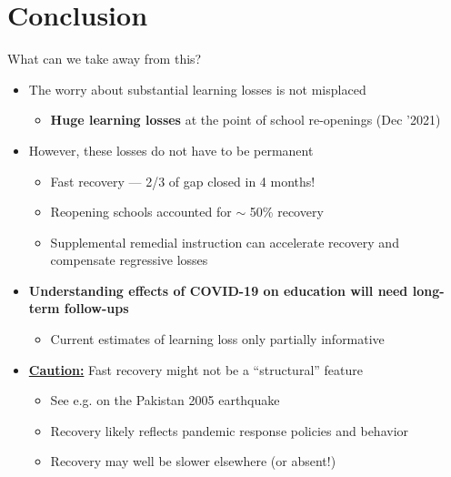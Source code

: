 \documentclass[aspectratio=169,numbering=none]{beamer}
\begin{document}
\section{Conclusion}

\begin{frame}[plain]{What can we take away from this?}
\begin{itemize}
\vfill \item The worry about substantial learning losses is not misplaced
\begin{itemize}
\vfill\item \textbf{Huge learning losses} at the point of school re-openings (Dec '2021)
\end{itemize}
\vfill \item However, these losses do not have to be permanent
\begin{itemize}
\vfill\item Fast recovery ---  2/3 of gap closed in 4 months!
\vfill\item Reopening schools accounted for $\sim$ 50\% recovery
\vfill \item Supplemental remedial instruction can accelerate recovery and compensate regressive losses
\end{itemize}
\vfill \item \textbf{Understanding effects of COVID-19 on education will need long-term follow-ups}
\begin{itemize}
\vfill\item Current estimates of learning loss only partially informative
\end{itemize}
\vfill \item \underline{\textbf{Caution:}} Fast recovery might not be a ``structural'' feature
\begin{itemize}
\vfill\item See e.g.  on the Pakistan 2005 earthquake
\vfill\item Recovery likely reflects pandemic response policies and behavior 
\vfill\item Recovery may well be slower elsewhere (or absent!) 
\end{itemize}
\end{itemize}
\end{frame}
\end{document}

